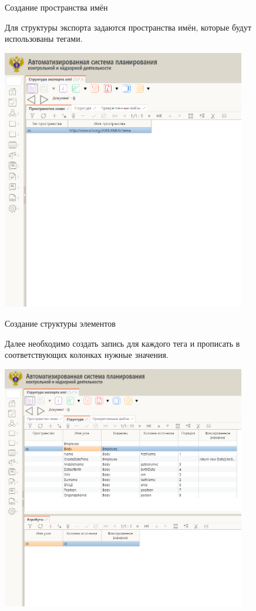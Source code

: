 \documentclass[fullscreen=true,russian,compress,%
	hyperref={unicode,bookmarks=false}]{presentation}
\begin{document}
\begin{frame}{Создание пространства имён}

Для структуры экспорта задаются пространства имён, которые будут использованы тегами.
\hfill
\centerline{\includegraphics[width=0.8\textwidth]{imgs/Namespaces.png}}

\end{frame}

\begin{frame}{Создание структуры элементов}

Далее необходимо создать запись для каждого тега и прописать в соответствующих колонках нужные значения.
\hfill
\centerline{\includegraphics[width=0.8\textwidth]{imgs/struct.png}}

\end{frame}
\end{document}
